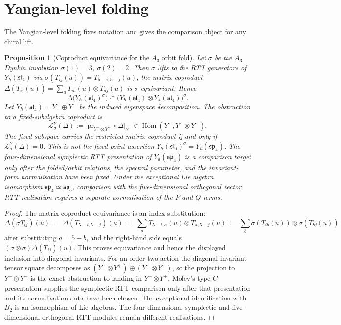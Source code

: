 \documentclass[11pt]{amsart}
\newtheorem{proposition}[theorem]{Proposition}
\theoremstyle{definition}
\theoremstyle{remark}
\providecommand{\fsl}{\mathfrak{sl}}
\providecommand{\fso}{\mathfrak{so}}
\providecommand{\fsp}{\mathfrak{sp}}
\renewcommand{\hbar}{\hslash}
\begin{document}
\section{Yangian-level folding}
\label{sec:yangian-folding-complete}

The Yangian-level folding fixes notation and gives the comparison
object for any chiral lift.

\begin{proposition}[Coproduct equivariance for the $A_3$ orbit fold]%
\label{prop:yangian-folding-B2}%
Let $\sigma$ be the $A_3$ Dynkin involution $\sigma(1) = 3$,
$\sigma(2) = 2$. Then $\sigma$ lifts to the RTT generators of
$Y_\hbar(\fsl_4)$ via $\sigma(T_{ij}(u)) = T_{5-i, 5-j}(u)$, the
matrix coproduct $\Delta(T_{ij}(u)) = \sum_a T_{i a}(u) \otimes T_{a
j}(u)$ is $\sigma$-equivariant. Hence
\[
  \Delta\bigl(Y_\hbar(\fsl_4)^\sigma\bigr)
  \subset
  \bigl(Y_\hbar(\fsl_4)\otimes Y_\hbar(\fsl_4)\bigr)^\sigma .
\]
Let $Y_\hbar(\fsl_4)=Y^+\oplus Y^-$ be the induced eigenspace
decomposition. The obstruction to a fixed-subalgebra coproduct is
\[
  \mathcal L^Y_\sigma(\Delta)
  :=
  \operatorname{pr}_{Y^-\otimes Y^-}\circ \Delta|_{Y^+}
  \in \operatorname{Hom}(Y^+,Y^-\otimes Y^-).
\]
The fixed subspace carries the restricted matrix coproduct if and only
if $\mathcal L^Y_\sigma(\Delta)=0$. This is not the fixed-point
assertion $Y_\hbar(\fsl_4)^\sigma=Y_\hbar(\fsp_4)$. The
four-dimensional symplectic RTT presentation of $Y_\hbar(\fsp_4)$ is a
comparison target only after the folded/orbit relations, the spectral
parameter, and the invariant-form normalisation have been fixed. Under
the exceptional Lie algebra isomorphism $\fsp_4\simeq\fso_5$,
comparison with the five-dimensional orthogonal vector RTT realisation
requires a separate normalisation of the $P$ and $Q$ terms.
\end{proposition}

\begin{proof}
The matrix coproduct equivariance is an index substitution:
\[
  \Delta(\sigma T_{ij})(u)
  \;=\; \Delta(T_{5-i,5-j})(u)
  \;=\; \sum_a T_{5-i,a}(u) \otimes T_{a,5-j}(u)
  \;=\; \sum_b \sigma(T_{ib}(u)) \otimes \sigma(T_{bj}(u))
\]
after substituting $a = 5 - b$, and the right-hand side equals
$(\sigma \otimes \sigma) \Delta(T_{ij})(u)$. This proves
equivariance and hence the displayed inclusion into diagonal
invariants. For an order-two action the diagonal invariant tensor
square decomposes as $(Y^+\otimes Y^+)\oplus(Y^-\otimes Y^-)$, so the
projection to $Y^-\otimes Y^-$ is the exact obstruction to landing in
$Y^+\otimes Y^+$. Molev's type-$C$ presentation supplies the
symplectic RTT comparison only after that presentation and its
normalisation data have been chosen. The exceptional identification
with $B_2$ is an isomorphism of Lie algebras. The four-dimensional
symplectic and five-dimensional orthogonal RTT modules remain different
realisations.
\end{proof}
\end{document}
